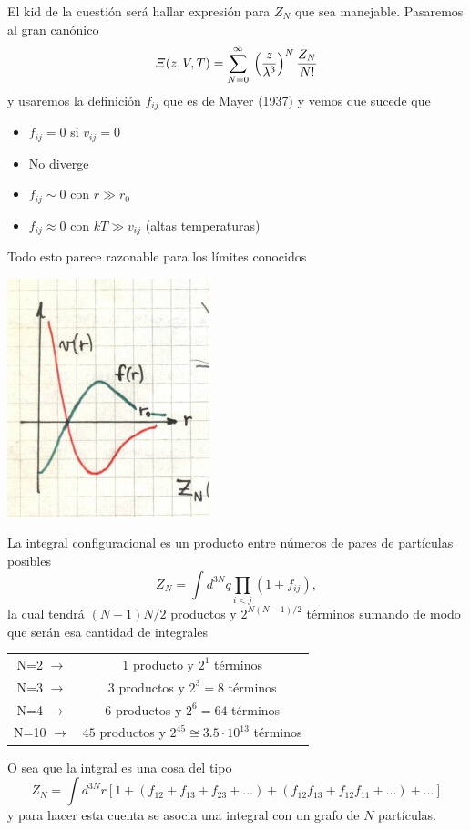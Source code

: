 \documentclass[10pt,oneside]{CBFT_book}
\begin{document}
El kid de la cuestión será hallar expresión para $Z_N$ que sea manejable. Pasaremos al gran canónico
\[
	\Xi(z,V,T) = \sum_{N=0}^\infty \: \left( \frac{ z }{ \lambda^3 } \right)^N \frac{ Z_N }{ N! }
\]
y usaremos la definición $f_{ij}$ que es de Mayer (1937) y vemos que sucede que 
\begin{itemize}
 \item $f_{ij}=0$ si $v_{ij}=0$
 \item No diverge
 \item $f_{ij} \sim 0$ con $r \gg r_0 $
 \item $f_{ij} \approx 0$ con $ k T \gg v_{ij}$ (altas temperaturas)
\end{itemize}

Todo esto parece razonable para los límites conocidos

\includegraphics[scale=0.4]{images/1606337067.jpg}

La integral configuracional es un producto entre números de pares de partículas posibles
\[
	Z_N = \int  d^{3N}q \prod_{i<j} ( 1 + f_{ij} ),
\]
la cual tendrá $ (N-1)N/2 $ productos y $ 2^{N(N-1)/2} $ términos sumando de modo que serán esa cantidad
de integrales
\begin{center}
\begin{tabular}{cc}
N=2 $ \to $ & $1$ producto y $2^1$ términos \\
N=3 $ \to $ & $3$ productos y $2^3=8$ términos \\
N=4 $ \to $ & $6$ productos y $2^6=64$ términos \\
N=10 $ \to $ & $45$ productos y $2^{45} \cong 3.5\cdot 10^{13}$ términos 
\end{tabular}
\end{center}
O sea que la intgral es una cosa del tipo 
\[
	Z_N = \int d^{3N}r \left[ 1 + (f_{12} + f_{13} + f_{23} + ... )
	+ ( f_{12} f_{13} + f_{12} f_{11} + ... ) + ... \right]
\]
y para hacer esta cuenta se asocia una integral con un grafo de $N$ partículas.
\end{document}
